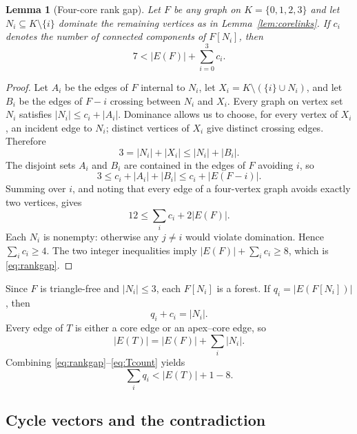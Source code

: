 \documentclass[11pt]{amsart}
\newtheorem{lemma}[theorem]{Lemma}
\theoremstyle{definition}
\begin{document}
\begin{lemma}[Four-core rank gap]\label{lem:rankgap}
Let $F$ be any graph on $K=\{0,1,2,3\}$ and let $N_i\subseteq K\setminus\{i\}$ dominate the remaining vertices as in Lemma~\ref{lem:corelinks}.  If $c_i$ denotes the number of connected components of $F[N_i]$, then
\begin{equation}\label{eq:rankgap}
  7< |E(F)|+\sum_{i=0}^3 c_i.
\end{equation}
\end{lemma}

\begin{proof}
Let $A_i$ be the edges of $F$ internal to $N_i$, let $X_i=K\setminus(\{i\}\cup N_i)$, and let $B_i$ be the edges of $F-i$ crossing between $N_i$ and $X_i$.  Every graph on vertex set $N_i$ satisfies
$|N_i|\le c_i+|A_i|$.  Dominance allows us to choose, for every vertex of $X_i$, an incident edge to $N_i$; distinct vertices of $X_i$ give distinct crossing edges.  Therefore
\[
  3=|N_i|+|X_i|\le |N_i|+|B_i|.
\]
The disjoint sets $A_i$ and $B_i$ are contained in the edges of $F$ avoiding $i$, so
\[
 3\le c_i+|A_i|+|B_i|
   \le c_i+|E(F-i)|.
\]
Summing over $i$, and noting that every edge of a four-vertex graph avoids exactly two vertices, gives
\begin{equation}\label{eq:twelve}
  12\le \sum_i c_i+2|E(F)|.
\end{equation}
Each $N_i$ is nonempty: otherwise any $j\ne i$ would violate domination.  Hence $\sum_i c_i\ge4$.  The two integer inequalities imply $|E(F)|+\sum_i c_i\ge8$, which is \eqref{eq:rankgap}.
\end{proof}

Since $F$ is triangle-free and $|N_i|\le3$, each $F[N_i]$ is a forest.  If $q_i=|E(F[N_i])|$, then
\begin{equation}\label{eq:forest}
  q_i+c_i=|N_i|.
\end{equation}
Every edge of $T$ is either a core edge or an apex--core edge, so
\begin{equation}\label{eq:Tcount}
  |E(T)|=|E(F)|+\sum_i |N_i|.
\end{equation}
Combining \eqref{eq:rankgap}--\eqref{eq:Tcount} yields
\begin{equation}\label{eq:generatorgap}
  \sum_i q_i < |E(T)|+1-8.
\end{equation}

\subsection{Cycle vectors and the contradiction}
\end{document}
